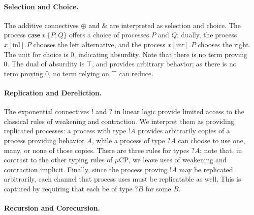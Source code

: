 \documentclass[orivec,envcountsame]{llncs}
\newcommand{\with}{\mathbin\binampersand}
\newcommand{\cpbang}[1]{{! #1}}
\newcommand{\cpquery}[1]{{? #1}}
\newcommand{\mkwd}[1]{\mathsf{#1}}
\newcommand{\clabel}[1]{\mathrm{#1}}
\renewcommand{\case}[2]{\mkwd{case}\:#1\:\{#2\}}
\newcommand{\sel}[2]{#1[\clabel{#2}]}
\newcommand{\mucp}{$\mu\mathrm{CP}$\xspace}
\begin{document}
\paragraph{Selection and Choice.}

The additive connectives $\oplus$ and $\with$ are interpreted as selection and choice. The process
$\case{x}{P;Q}$ offers a choice of processes $P$ and $Q$; dually, the process $\sel{x}{inl}.P$
chooses the left alternative, and the process $\sel{x}{inr}.P$ chooses the right.  The unit for
choice is $0$, indicating absurdity. Note that there is no term proving $0$.  The dual of absurdity
is $\top$, and provides arbitrary behavior; as there is no term proving $0$, no term relying on
$\top$ can reduce.

\paragraph{Replication and Dereliction.}

The exponential connectives $!$ and $?$ in linear logic provide limited access to the classical
rules of weakening and contraction.  We interpret them as providing replicated processes: a process
with type $\cpbang{A}$ provides arbitrarily copies of a process providing behavior $A$, while a
process of type $\cpquery{A}$ can choose to use one, many, or none of those copies.  There are three
rules for types $\cpquery{A}$; note that, in contrast to the other typing rules of \mucp, we leave
uses of weakening and contraction implicit.  Finally, since the process proving $\cpbang{A}$ may be
replicated arbitrarily, each channel that process uses must be replicatable as well.  This is
captured by requiring that each be of type $\cpquery{B}$ for some $B$.

\paragraph{Recursion and Corecursion.}
\end{document}

